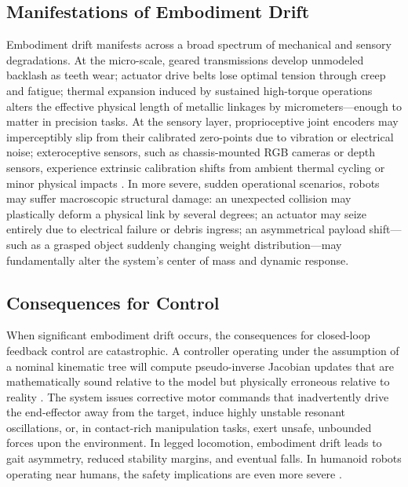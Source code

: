 \documentclass[12pt,a4paper,oneside]{report}
\begin{document}
\subsection{Manifestations of Embodiment Drift}
\label{subsec:manifestations_embodiment_drift}

Embodiment drift manifests across a broad spectrum of mechanical and sensory degradations. At the micro-scale, geared transmissions develop unmodeled backlash as teeth wear; actuator drive belts lose optimal tension through creep and fatigue; thermal expansion induced by sustained high-torque operations alters the effective physical length of metallic linkages by micrometers—enough to matter in precision tasks. At the sensory layer, proprioceptive joint encoders may imperceptibly slip from their calibrated zero-points due to vibration or electrical noise; exteroceptive sensors, such as chassis-mounted RGB cameras or depth sensors, experience extrinsic calibration shifts from ambient thermal cycling or minor physical impacts \cite{rezvani2024robust}. In more severe, sudden operational scenarios, robots may suffer macroscopic structural damage: an unexpected collision may plastically deform a physical link by several degrees; an actuator may seize entirely due to electrical failure or debris ingress; an asymmetrical payload shift—such as a grasped object suddenly changing weight distribution—may fundamentally alter the system's center of mass and dynamic response.

\subsection{Consequences for Control}
\label{subsec:consequences_control}

When significant embodiment drift occurs, the consequences for closed-loop feedback control are catastrophic. A controller operating under the assumption of a nominal kinematic tree will compute pseudo-inverse Jacobian updates that are mathematically sound relative to the model but physically erroneous relative to reality \cite{siciliano2009robotics}. The system issues corrective motor commands that inadvertently drive the end-effector away from the target, induce highly unstable resonant oscillations, or, in contact-rich manipulation tasks, exert unsafe, unbounded forces upon the environment. In legged locomotion, embodiment drift leads to gait asymmetry, reduced stability margins, and eventual falls. In humanoid robots operating near humans, the safety implications are even more severe \cite{kwiatkowski2019task}.
\end{document}
